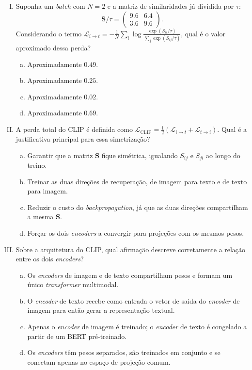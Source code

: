 \documentclass{dlproblemset}
\begin{document}
\begin{enumerate}[I)]
    \item {} Suponha um \textit{batch} com $N = 2$ e a matriz de similaridades já dividida por $\tau$:
    \[
        \mathbf{S}/\tau = \begin{pmatrix} 9.6 & 6.4 \\ 3.6 & 9.6 \end{pmatrix}.
    \]
    Considerando o termo $\mathcal{L}_{i \to t} = -\tfrac{1}{N}\sum_i \log\frac{\exp(S_{ii}/\tau)}{\sum_j \exp(S_{ij}/\tau)}$, qual é o valor aproximado dessa perda?
    \begin{enumerate}[(a)]
        \item Aproximadamente $0.49$.
        \item Aproximadamente $0.25$.
        \item Aproximadamente $0.02$.
        \item Aproximadamente $0.69$.
    \end{enumerate}

    \item A perda total do CLIP é definida como $\mathcal{L}_{\text{CLIP}} = \tfrac{1}{2}(\mathcal{L}_{i \to t} + \mathcal{L}_{t \to i})$. Qual é a justificativa principal para essa simetrização?
    \begin{enumerate}[(a)]
        \item Garantir que a matriz $\mathbf{S}$ fique simétrica, igualando $S_{ij}$ e $S_{ji}$ ao longo do treino.
        \item Treinar as duas direções de recuperação, de imagem para texto e de texto para imagem.
        \item Reduzir o custo do \textit{backpropagation}, já que as duas direções compartilham a mesma $\mathbf{S}$.
        \item Forçar os dois \textit{encoders} a convergir para projeções com os mesmos pesos.
    \end{enumerate}

    \item Sobre a arquitetura do CLIP, qual afirmação descreve corretamente a relação entre os dois \textit{encoders}?
    \begin{enumerate}[(a)]
        \item Os \textit{encoders} de imagem e de texto compartilham pesos e formam um único \textit{transformer} multimodal.
        \item O \textit{encoder} de texto recebe como entrada o vetor de saída do \textit{encoder} de imagem para então gerar a representação textual.
        \item Apenas o \textit{encoder} de imagem é treinado; o \textit{encoder} de texto é congelado a partir de um BERT pré-treinado.
        \item Os \textit{encoders} têm pesos separados, são treinados em conjunto e se conectam apenas no espaço de projeção comum.
    \end{enumerate}


\end{enumerate}
\end{document}
